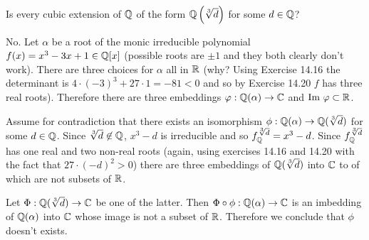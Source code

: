     \begin{ex}{21.24}
        Is every cubic extension of $\mathbb{Q}$ of the form $\mathbb{Q}\left(\sqrt[3]{d}\right)$ for some $d\in\mathbb{Q}$?
    \end{ex}
    \begin{sol}
        No. Let $\alpha$ be a root of the monic irreducible polynomial $f(x)=x^3-3x+1\in\mathbb{Q}[x]$ (possible roots are $\pm 1$ and they both clearly don't work).
        There are three choices for $\alpha$ all in $\mathbb{R}$ (why? Using Exercise 14.16 the determinant is $4\cdot(-3)^3+27\cdot 1=-81<0$ and so by Exercise 14.20 $f$ has three real roots).
        Therefore there are three embeddings $\varphi:\mathbb{Q}(\alpha)\to\mathbb{C}$ and $\text{Im }\varphi\subset\mathbb{R}$.
        
        Assume for contradiction that there exists an isomorphism $\phi:\mathbb{Q}(\alpha)\to\mathbb{Q}(\sqrt[3]{d})$ for some $d\in\mathbb{Q}$.
        Since $\sqrt[3]{d}\not\in\mathbb{Q}$, $x^3-d$ is irreducible and so $f_{\mathbb{Q}}^{\sqrt[3]{d}}=x^3-d$.
        Since $f_{\mathbb{Q}}^{\sqrt[3]{d}}$ has one real and two non-real roots (again, using exercises 14.16 and 14.20 with the fact that $27\cdot(-d)^2>0$) there are three embeddings of $\mathbb{Q}(\sqrt[3]{d})$ into $\mathbb{C}$ to of which are not subsets of $\mathbb{R}$.
        
        Let $\Phi:\mathbb{Q}(\sqrt[3]{d})\to\mathbb{C}$ be one of the latter. 
        Then $\Phi\circ\phi:\mathbb{Q}(\alpha)\to\mathbb{C}$ is an imbedding of $\mathbb{Q}(\alpha)$ into $\mathbb{C}$ whose image is not a subset of $\mathbb{R}$.
        Therefore we conclude that $\phi$ doesn't exists.
    \end{sol}

